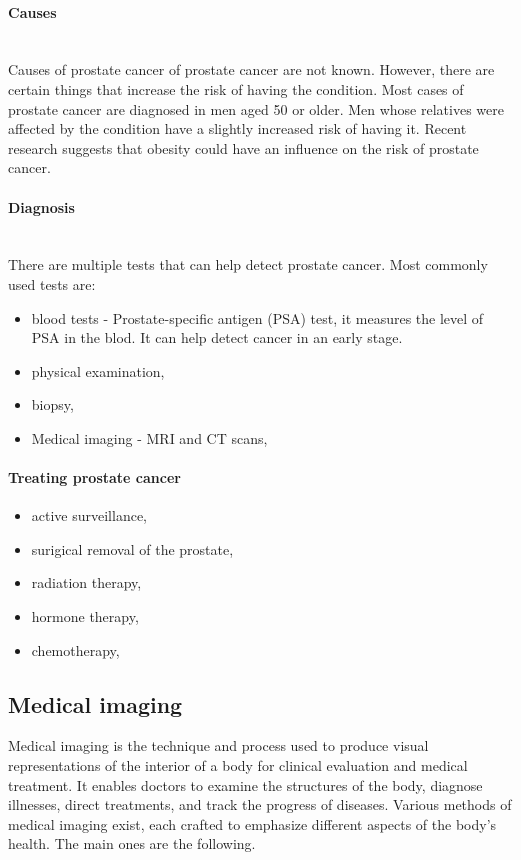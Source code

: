\paragraph{Causes\cite{nhs_choices_2024}}\mbox{} \\
Causes of prostate cancer of prostate cancer are not known. However, there are certain things that increase the risk of having the condition. 
Most cases of prostate cancer are diagnosed in men aged 50 or older. 
Men whose relatives were affected by the condition have a slightly increased risk of having it. Recent research suggests that obesity could have an influence on the risk of prostate cancer.

\paragraph{Diagnosis\cite{nhs_choices_2024}}\mbox{} \\
There are multiple tests that can help detect prostate cancer. 
Most commonly used tests are\cite{nhs_choices_2024}:
\begin{itemize}
    \item blood tests - Prostate-specific antigen (PSA) test, it measures the level of PSA in the blod. It can help detect cancer in an early stage.
    \item physical examination,
    \item biopsy,
    \item Medical imaging - MRI and CT scans,
\end{itemize}

\paragraph{Treating prostate cancer\cite{nhs_choices_2024}}
\begin{itemize}
    \item active surveillance,
    \item surigical removal of the prostate,
    \item radiation therapy,
    \item hormone therapy,
    \item chemotherapy,
    
\end{itemize}

\subsection{Medical imaging}
Medical imaging is the technique and process used to produce visual representations of the interior of a body for clinical evaluation and medical treatment. It enables doctors to examine the structures of the body, diagnose illnesses, direct treatments, and track the progress of diseases. Various methods of medical imaging exist, each crafted to emphasize different aspects of the body's health. The main ones are the following.

